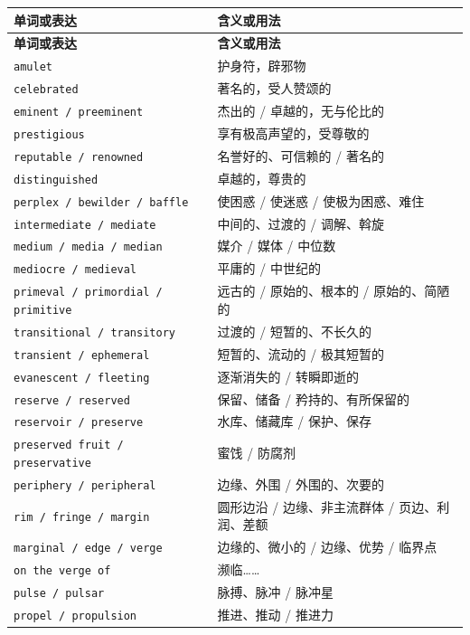 \documentclass[UTF8,zihao=-4]{ctexart}
\begin{document}
\begin{longtable}{>{\raggedright\arraybackslash}p{5.0cm} >{\raggedright\arraybackslash}p{9.5cm}}
\toprule
\textbf{单词或表达} & \textbf{含义或用法} \\
\midrule
\endfirsthead
\toprule
\textbf{单词或表达} & \textbf{含义或用法} \\
\midrule
\endhead
\texttt{amulet} & 护身符，辟邪物 \\
\texttt{celebrated} & 著名的，受人赞颂的 \\
\texttt{eminent / preeminent} & 杰出的 / 卓越的，无与伦比的 \\
\texttt{prestigious} & 享有极高声望的，受尊敬的 \\
\texttt{reputable / renowned} & 名誉好的、可信赖的 / 著名的 \\
\texttt{distinguished} & 卓越的，尊贵的 \\
\texttt{perplex / bewilder / baffle} & 使困惑 / 使迷惑 / 使极为困惑、难住 \\
\texttt{intermediate / mediate} & 中间的、过渡的 / 调解、斡旋 \\
\texttt{medium / media / median} & 媒介 / 媒体 / 中位数 \\
\texttt{mediocre / medieval} & 平庸的 / 中世纪的 \\
\texttt{primeval / primordial / primitive} & 远古的 / 原始的、根本的 / 原始的、简陋的 \\
\texttt{transitional / transitory} & 过渡的 / 短暂的、不长久的 \\
\texttt{transient / ephemeral} & 短暂的、流动的 / 极其短暂的 \\
\texttt{evanescent / fleeting} & 逐渐消失的 / 转瞬即逝的 \\
\texttt{reserve / reserved} & 保留、储备 / 矜持的、有所保留的 \\
\texttt{reservoir / preserve} & 水库、储藏库 / 保护、保存 \\
\texttt{preserved fruit / preservative} & 蜜饯 / 防腐剂 \\
\texttt{periphery / peripheral} & 边缘、外围 / 外围的、次要的 \\
\texttt{rim / fringe / margin} & 圆形边沿 / 边缘、非主流群体 / 页边、利润、差额 \\
\texttt{marginal / edge / verge} & 边缘的、微小的 / 边缘、优势 / 临界点 \\
\texttt{on the verge of} & 濒临…… \\
\texttt{pulse / pulsar} & 脉搏、脉冲 / 脉冲星 \\
\texttt{propel / propulsion} & 推进、推动 / 推进力 \\

\end{longtable}
\end{document}
